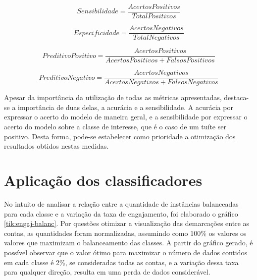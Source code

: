 \documentclass[oneside,openright,12pt]{ufsm_2015} %
\begin{document}
    \begin{equation} \label{eq:sensibilidade}
    Sensibilidade = \frac{AcertosPositivos}{TotalPositivos}
    \end{equation}
    
    \begin{equation} \label{eq:especificidade}
    Especificidade = \frac{AcertosNegativos}{TotalNegativos}
    \end{equation}
    
    \begin{equation} \label{eq:predit-pos}
    PreditivoPositivo = \frac{AcertosPositivos}{AcertosPositivos + FalsosPositivos}
    \end{equation}
    
    \begin{equation} \label{eq:predit-neg}
    PreditivoNegativo = \frac{AcertosNegativos}{AcertosNegativos + FalsosNegativos}
    \end{equation}
    
    \par Apesar da importância da utilização de todas as métricas apresentadas, destaca-se a importância de duas delas, a acurácia e a sensibilidade. A acurácia por expressar o acerto do modelo de maneira geral, e a sensibilidade por expressar o acerto do modelo sobre a classe de interesse, que é o caso de um tuíte ser positivo. Desta forma, pode-se estabelecer como prioridade a otimização dos resultados obtidos nestas medidas.
    

\section{Aplicação dos classificadores}
\label{sec:exp-class}

    \par No intuito de analisar a relação entre a quantidade de instâncias balanceadas para cada classe e a variação da taxa de engajamento, foi elaborado o gráfico \ref{tik:engaj-balanc}. Por questões otimizar a visualização das demarcações entre as contas, as quantidades foram normalizadas, assumindo como 100\% os valores os valores que maximizam o balanceamento das classes. A partir do gráfico gerado, é possível observar que o valor ótimo para maximizar o número de dados contidos em cada classe é 2\%, se consideradas todas as contas, e a variação dessa taxa para qualquer direção, resulta em uma perda de dados considerável.
    
\end{document}
